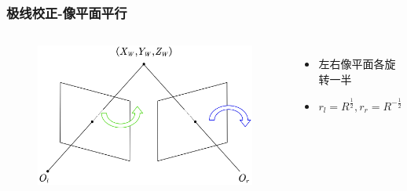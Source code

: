 \documentclass[aspectratio=43]{beamer}
\begin{document}
		\begin{frame}
		\frametitle{极线校正-像平面平行}
		\begin{columns}
		\column{5cm}
		\begin{figure}
		\begin{center}
			\includegraphics[scale=0.5]{极线校正-像平面平行-旋转}
		\end{center}
		\end{figure}
		\column{5cm}
		\begin{itemize}
			\item 左右像平面各旋转一半
			\item $r_l=R^{\frac{1}{2}},r_r=R^{-\frac{1}{2}}$			
		\end{itemize}
		\end{columns}
		\end{frame}
	
\end{document}
